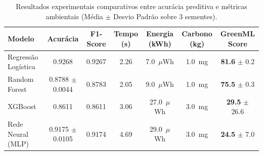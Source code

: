 \begin{table}[htbp]
\centering
\small
\caption{Resultados experimentais comparativos entre acurácia preditiva e métricas ambientais (Média $\pm$ Desvio Padrão sobre 3 sementes).}
\label{tab:resultados_greenml}
\begin{tabular}{lcccccc}
\toprule
\textbf{Modelo} & \textbf{Acurácia} & \textbf{F1-Score} & \textbf{Tempo (s)} & \textbf{Energia (kWh)} & \textbf{Carbono (kg)} & \textbf{GreenML Score} \\
\midrule
Regressão Logística & 0.9268 & 0.9267 & 2.26 & 7.0~$\mu$Wh & 1.0~mg & \textbf{81.6} $\pm$ 0.2 \\
Random Forest & 0.8788 $\pm$ 0.0044 & 0.8783 & 2.05 & 9.0~$\mu$Wh & 1.0~mg & \textbf{75.5} $\pm$ 0.3 \\
XGBoost & 0.8611 & 0.8611 & 3.06 & 27.0~$\mu$Wh & 3.0~mg & \textbf{29.5} $\pm$ 26.6 \\
Rede Neural (MLP) & 0.9175 $\pm$ 0.0105 & 0.9174 & 4.69 & 29.0~$\mu$Wh & 3.0~mg & \textbf{24.5} $\pm$ 7.0 \\
\bottomrule
\end{tabular}
\end{table}
